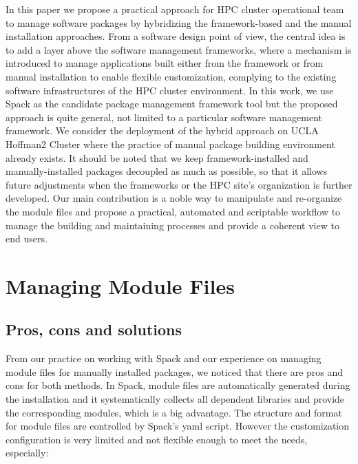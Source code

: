 \documentclass[conference]{IEEEtran}
\begin{document}
In this paper we propose a practical approach for HPC cluster operational team to manage software packages by hybridizing the framework-based and the manual installation approaches. 
From a software design point of view, the central idea is to add a layer above the software management frameworks, where a mechanism is introduced to manage applications built either from the framework or from manual installation to enable flexible customization, complying to the existing software infrastructures of the HPC cluster environment.
In this work, we use Spack as the candidate package management framework tool but the proposed approach is quite general, not limited to a particular software management framework. We consider the deployment of the hybrid approach on UCLA Hoffman2 Cluster where the practice of manual package building environment already exists.
It should be noted that we keep framework-installed and manually-installed packages decoupled as much as possible, so that it allows future adjustments when the frameworks or the HPC site's organization is further developed. 
Our main contribution is a noble way to manipulate and re-organize the module files and propose a practical, automated and scriptable workflow to manage the building and maintaining processes and provide a coherent view to end users.


\section{Managing Module Files} \label{sec_modulefiles}

\subsection{Pros, cons and solutions}

From our practice on working with Spack and our experience on managing module files for manually installed packages, we noticed that there are pros and cons for both methods. In Spack, module files are automatically generated during the installation and it systematically collects all dependent libraries and provide the corresponding modules, which is a big advantage. The structure and format for module files are controlled by Spack's yaml script. However the customization configuration is very limited and not flexible enough to meet the needs, especially:
\end{document}
